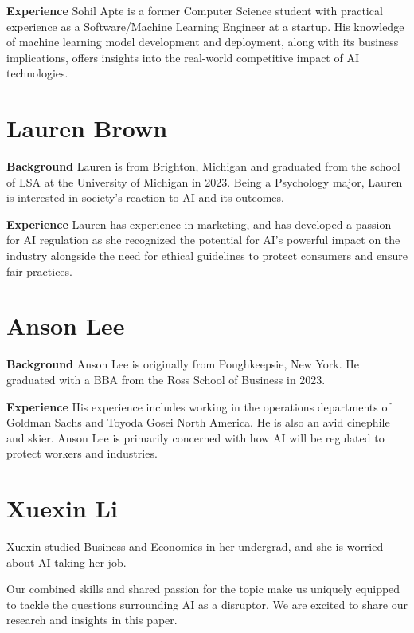 \documentclass[
]{book}
\begin{document}
\textbf{Experience}
Sohil Apte is a former Computer Science student with practical experience as a Software/Machine Learning Engineer at a startup. His knowledge of machine learning model development and deployment, along with its business implications, offers insights into the real-world competitive impact of AI technologies.

\hypertarget{lauren-brown}{%
\section{Lauren Brown}\label{lauren-brown}}

\textbf{Background}
Lauren is from Brighton, Michigan and graduated from the school of LSA at the University of Michigan in 2023. Being a Psychology major, Lauren is interested in society's reaction to AI and its outcomes.

\textbf{Experience}
Lauren has experience in marketing, and has developed a passion for AI regulation as she recognized the potential for AI's powerful impact on the industry alongside the need for ethical guidelines to protect consumers and ensure fair practices.

\hypertarget{anson-lee}{%
\section{Anson Lee}\label{anson-lee}}

\textbf{Background}
Anson Lee is originally from Poughkeepsie, New York. He graduated with a BBA from the Ross School of Business in 2023.

\textbf{Experience}
His experience includes working in the operations departments of Goldman Sachs and Toyoda Gosei North America. He is also an avid cinephile and skier. Anson Lee is primarily concerned with how AI will be regulated to protect workers and industries.

\hypertarget{xuexin-li}{%
\section{Xuexin Li}\label{xuexin-li}}

Xuexin studied Business and Economics in her undergrad, and she is worried about AI taking her job.

Our combined skills and shared passion for the topic make us uniquely equipped to tackle the questions surrounding AI as a disruptor. We are excited to share our research and insights in this paper.
\end{document}
